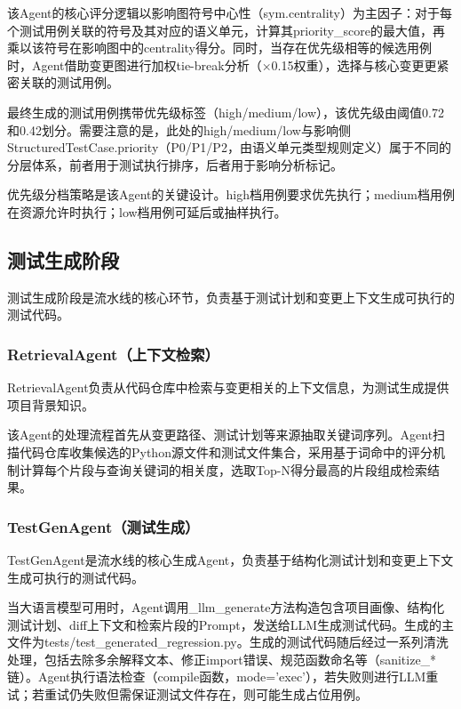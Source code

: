 该Agent的核心评分逻辑以影响图符号中心性（sym.centrality）为主因子：对于每个测试用例关联的符号及其对应的语义单元，计算其priority\_score的最大值，再乘以该符号在影响图中的centrality得分。同时，当存在优先级相等的候选用例时，Agent借助变更图进行加权tie-break分析（×0.15权重），选择与核心变更更紧密关联的测试用例。

最终生成的测试用例携带优先级标签（high/medium/low），该优先级由阈值0.72和0.42划分。需要注意的是，此处的high/medium/low与影响侧StructuredTestCase.priority（P0/P1/P2，由语义单元类型规则定义）属于不同的分层体系，前者用于测试执行排序，后者用于影响分析标记。

优先级分档策略是该Agent的关键设计。high档用例要求优先执行；medium档用例在资源允许时执行；low档用例可延后或抽样执行。
\subsection{测试生成阶段}
测试生成阶段是流水线的核心环节，负责基于测试计划和变更上下文生成可执行的测试代码。
\subsubsection{RetrievalAgent（上下文检索）}
RetrievalAgent负责从代码仓库中检索与变更相关的上下文信息，为测试生成提供项目背景知识。

该Agent的处理流程首先从变更路径、测试计划等来源抽取关键词序列。Agent扫描代码仓库收集候选的Python源文件和测试文件集合，采用基于词命中的评分机制计算每个片段与查询关键词的相关度，选取Top-N得分最高的片段组成检索结果。
\subsubsection{TestGenAgent（测试生成）}
TestGenAgent是流水线的核心生成Agent，负责基于结构化测试计划和变更上下文生成可执行的测试代码。

当大语言模型可用时，Agent调用\_llm\_generate方法构造包含项目画像、结构化测试计划、diff上下文和检索片段的Prompt，发送给LLM生成测试代码。生成的主文件为tests/test\_generated\_regression.py。生成的测试代码随后经过一系列清洗处理，包括去除多余解释文本、修正import错误、规范函数命名等（sanitize\_*链）。Agent执行语法检查（compile函数，mode='exec'），若失败则进行LLM重试；若重试仍失败但需保证测试文件存在，则可能生成占位用例。

